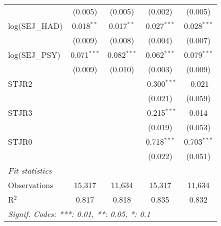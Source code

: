 \begin{tabular}{lcccc}
                       & (0.005)                           & (0.005)       & (0.002)        & (0.005)       \\
   log(SEJ\_HAD)       & 0.018$^{**}$                      & 0.017$^{**}$  & 0.027$^{***}$  & 0.028$^{***}$ \\
                       & (0.009)                           & (0.008)       & (0.004)        & (0.007)       \\
   log(SEJ\_PSY)       & 0.071$^{***}$                     & 0.082$^{***}$ & 0.062$^{***}$  & 0.079$^{***}$ \\
                       & (0.009)                           & (0.010)       & (0.003)        & (0.009)       \\
   STJR2               &                                   &               & -0.300$^{***}$ & -0.021        \\
                       &                                   &               & (0.021)        & (0.059)       \\
   STJR3               &                                   &               & -0.215$^{***}$ & 0.014         \\
                       &                                   &               & (0.019)        & (0.053)       \\
   STJR0               &                                   &               & 0.718$^{***}$  & 0.703$^{***}$ \\
                       &                                   &               & (0.022)        & (0.051)       \\
   \midrule
   \emph{Fit statistics}                                                                                    \\
   Observations        & 15,317                            & 11,634        & 15,317         & 11,634        \\
   R$^2$               & 0.817                             & 0.818         & 0.835          & 0.832         \\
   \midrule \midrule
   \multicolumn{5}{l}{\emph{Signif. Codes: ***: 0.01, **: 0.05, *: 0.1}}                                    \\
\end{tabular}
\par\endgroup

